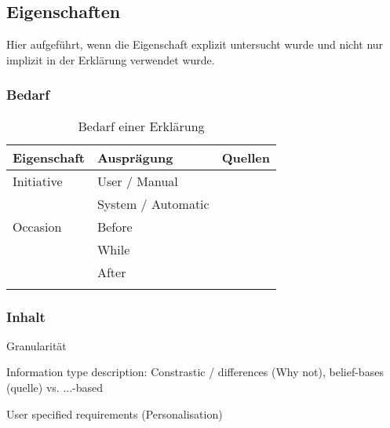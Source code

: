 \subsection{Eigenschaften}

Hier aufgeführt, wenn die Eigenschaft explizit untersucht wurde und nicht nur implizit in der Erklärung verwendet wurde.

\subsubsection*{Bedarf}

\begin{longtable}{|p{}|p{}|p{}|}
    \hline
    \textbf{Eigenschaft}    & \textbf{Ausprägung}   & \textbf{Quellen} \\ \hline
    Initiative              &  User / Manual        & \cite{chazette_end-users_nodate} \cite{tintarev_designing_nodate} \cite{wiegand_id_2020} \\
                            &  System / Automatic   & \cite{chazette_end-users_nodate} \cite{eiband_impact_2019} \cite{wiegand_id_2020} \cite{schaffer_i_2019} \cite{yamada_evaluating_2016} \\
    \hline
    Occasion                &  Before               & \cite{rosenfeld_explainability_2019} \cite{wiegand_id_2020} \cite{kunkel_let_2019} \cite{koo_why_2015} \cite{haspiel_explanations_2018} \\
                            &  While                & \cite{rosenfeld_explainability_2019} \cite{wiegand_id_2020} \cite{kunkel_let_2019} \\
                            &  After                & \cite{rosenfeld_explainability_2019} \cite{wiegand_id_2020} \cite{kunkel_let_2019} \cite{koo_why_2015} \cite{haspiel_explanations_2018} \cite{wiegand2019drive} \\
    \hline
\caption{Bedarf einer Erklärung}
\label{tab:explanation_demands}
\end{longtable}

\subsubsection*{Inhalt}

Granularität

Information type description: Constrastic / differences (Why not), belief-bases (quelle) vs. ...-based

User specified requirements (Personalisation) \cite{tintarev_designing_nodate, sokol_explainability_2020}

